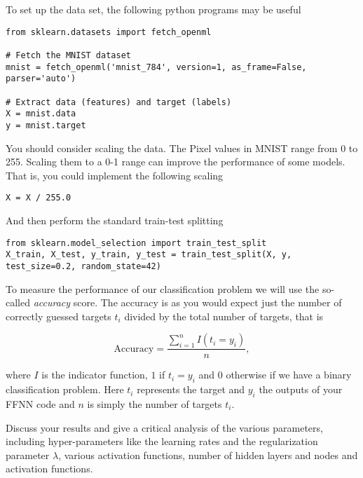 \documentclass[%
oneside,                 %
final,                   %
10pt]{article}
\begin{document}
To set up the data set, the following python programs may be useful









\begin{verbatim}
from sklearn.datasets import fetch_openml

# Fetch the MNIST dataset
mnist = fetch_openml('mnist_784', version=1, as_frame=False, parser='auto')

# Extract data (features) and target (labels)
X = mnist.data
y = mnist.target

\end{verbatim}

You should consider scaling the data. The Pixel values in MNIST range from 0 to 255. Scaling them to a 0-1 range can improve the performance of some models. That is, you could implement the following scaling


\begin{verbatim}
X = X / 255.0

\end{verbatim}

And then perform the standard train-test splitting



\begin{verbatim}
from sklearn.model_selection import train_test_split
X_train, X_test, y_train, y_test = train_test_split(X, y, test_size=0.2, random_state=42)

\end{verbatim}


To measure the performance of our classification problem we will use the
so-called \emph{accuracy} score.  The accuracy is as you would expect just
the number of correctly guessed targets $t_i$ divided by the total
number of targets, that is 

\[ 
\text{Accuracy} = \frac{\sum_{i=1}^n I(t_i = y_i)}{n} ,
\]

where $I$ is the indicator function, $1$ if $t_i = y_i$ and $0$
otherwise if we have a binary classification problem. Here $t_i$
represents the target and $y_i$ the outputs of your FFNN code and $n$ is simply the number of targets $t_i$.

Discuss your results and give a critical analysis of the various parameters, including hyper-parameters like the learning rates and the regularization parameter $\lambda$, various activation functions, number of hidden layers and nodes and activation functions.  
\end{document}
